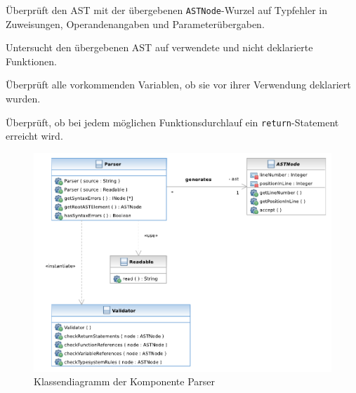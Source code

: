 \begin{description}
    Überprüft den AST mit der übergebenen \texttt{ASTNode}-Wurzel auf Typfehler in Zuweisungen, Operandenangaben und Parameterübergaben.

    Untersucht den übergebenen AST auf verwendete und nicht deklarierte Funktionen.

    Überprüft alle vorkommenden Variablen, ob sie vor ihrer Verwendung deklariert wurden.

    Überprüft, ob bei jedem möglichen Funktionsdurchlauf ein \texttt{return}-Statement erreicht wird.
\end{description}

\begin{figure}%
    \includegraphics[width=\textwidth]{diagrams/parser_component.pdf}

    \caption{Klassendiagramm der Komponente Parser}
\end{figure}%
